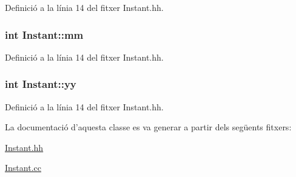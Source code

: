 Definició a la línia 14 del fitxer Instant.\-hh.

\hypertarget{class_instant_a2912b4df6ae47c81da8f5e041ddc2266}{
\subsubsection[{mm}]{\setlength{\rightskip}{0pt plus 5cm}int Instant\-::mm\hspace{0.3cm}{\ttfamily [private]}}}\label{class_instant_a2912b4df6ae47c81da8f5e041ddc2266}


Definició a la línia 14 del fitxer Instant.\-hh.

\hypertarget{class_instant_a67fe547756040a8d5d9088c9827bedba}{
\subsubsection[{yy}]{\setlength{\rightskip}{0pt plus 5cm}int Instant\-::yy\hspace{0.3cm}{\ttfamily [private]}}}\label{class_instant_a67fe547756040a8d5d9088c9827bedba}


Definició a la línia 14 del fitxer Instant.\-hh.



La documentació d'aquesta classe es va generar a partir dels següents fitxers\-:\begin{DoxyCompactItemize}
\item 
\hyperlink{_instant_8hh}{Instant.\-hh}\item 
\hyperlink{_instant_8cc}{Instant.\-cc}\end{DoxyCompactItemize}
